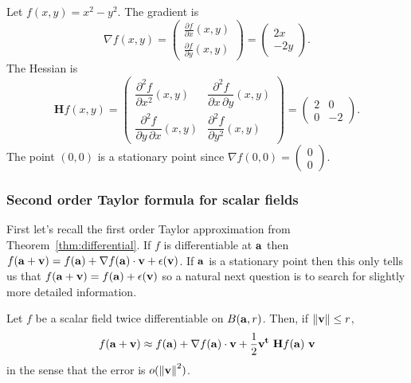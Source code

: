 \begin{example*}
    Let \(f(x,y)=x^2-y^2\).
    The gradient is
    \[\nabla f(x,y) =\begin{pmatrix}
            \frac{\partial f}{\partial x} (x,y) \\[2.2ex]
            \frac{\partial f}{\partial y} (x,y)
        \end{pmatrix} =   \begin{pmatrix}
            2x \\-2y
        \end{pmatrix}.
    \]
    The Hessian is
    \[
        \mathbf{H} f (x,y)= \begin{pmatrix}
            \dfrac{\partial^2 f}{\partial x^2} (x,y)
             & \dfrac{\partial^2 f}{\partial x\,\partial y} (x,y)
            \\[2.2ex]
            \dfrac{\partial^2 f}{\partial y\,\partial x} (x,y)
             & \dfrac{\partial^2 f}{\partial y^2}(x,y)
        \end{pmatrix}
        = \begin{pmatrix}
            2
             & 0
            \\[2.2ex]
            0
             & -2
        \end{pmatrix}.
    \]
    The point \((0,0)\) is a stationary point since \(\nabla f(0,0) =\left(\begin{smallmatrix}
            0\\0
        \end{smallmatrix}\right) \).
\end{example*}


\subsubsection*{Second order Taylor formula for scalar fields}

First let's recall the first order Taylor approximation from Theorem~\ref{thm:differential}.
If \(f\) is differentiable at \(\aa\)
then
\(  f(\aa+  \vv) = f(\aa)  + \nabla f(\aa) \cdot \vv + \epsilon(\vv)\).
If \(\aa\) is a stationary point then this only tells us that \(  f(\aa+  \vv) = f(\aa)  +  \epsilon(\vv)\) so a natural next question is to search for slightly more detailed information.

\begin{theorem}
    Let \(f\) be a scalar field twice differentiable on \(B(\aa,r)\).
    Then, if \(\norm{\vv}\leq r\),
    \[
        f(\aa+\vv) \approx f(\aa) + \nabla f(\aa) \cdot \vv + \frac{1}{2} \vv^{\mathbf{t}} \ \mathbf{H} f (\aa) \ \vv
    \]
    in the sense that the error is \(\littleo{\norm{\vv}^2}\).
\end{theorem}




